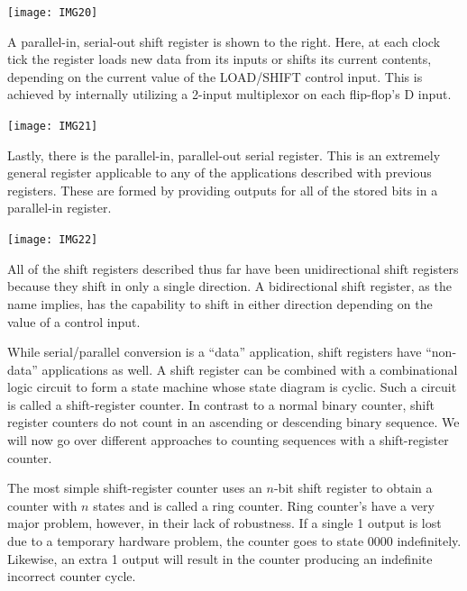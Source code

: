 \documentclass[10pt,a4paper]{article}
\begin{document}
\begin{itemize}
\begin{minipage}{.55\textwidth}
\end{minipage}
\begin{minipage}{.45\textwidth}
\texttt{[image: IMG20]}
\end{minipage}
\begin{minipage}{.55\textwidth}
\item A parallel-in, serial-out shift register is shown to the right. Here, at each clock tick the register loads new data from its inputs or shifts its current contents, depending on the current value of the LOAD/SHIFT control input. This is achieved by internally utilizing a 2-input multiplexor on each flip-flop's D input. 
\end{minipage}
\begin{minipage}{.45\textwidth}
\texttt{[image: IMG21]}
\end{minipage}
\begin{minipage}{.55\textwidth}
\item Lastly, there is the parallel-in, parallel-out serial register. This is an extremely general register applicable to any of the applications described with previous registers. These are formed by providing outputs for all of the stored bits in a parallel-in register.
\end{minipage}
\begin{minipage}{.45\textwidth}
\texttt{[image: IMG22]}
\end{minipage}
\item All of the shift registers described thus far have been unidirectional shift registers because they shift in only a single direction. A bidirectional shift register, as the name implies, has the capability to shift in either direction depending on the value of a control input. 
\item While serial/parallel conversion is a ``data'' application, shift registers have ``non-data'' applications as well. A shift register can be combined with a combinational logic circuit to form a state machine whose state diagram is cyclic. Such a circuit is called a shift-register counter. In contrast to a normal binary counter, shift register counters do not count in an ascending or descending binary sequence. We will now go over different approaches to counting sequences with a shift-register counter.
\item The most simple shift-register counter uses an $n$-bit shift register to obtain a counter with $n$ states and is called a ring counter. Ring counter's have a very major problem, however, in their lack of robustness. If a single 1 output is lost due to a temporary hardware problem, the counter goes to state 0000 indefinitely. Likewise, an extra 1 output will result in the counter producing an indefinite incorrect counter cycle. 

\end{itemize}
\end{document}
